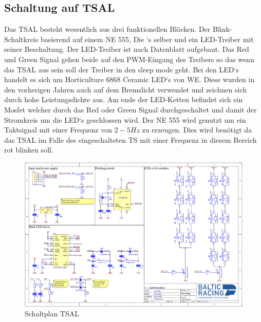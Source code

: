 \FloatBarrier
\subsection{Schaltung auf \ac{TSAL}}

Das \ac{TSAL} besteht wesentlich aus drei funktionellen Blöcken. Der Blink-Schaltkreis basierend auf einem NE 555, Die `s selber und ein \ac{LED}-Treiber mit seiner Beschaltung. Der \ac{LED}-Treiber ist nach Datenblatt aufgebaut. Das Red und Green Signal gehen beide auf den \ac{PWM}-Eingang des Treibers so das wenn das \ac{TSAL} aus sein soll der Treiber in den sleep mode geht. Bei den \ac{LED}`s handelt es sich um Horticulture 6868 Ceramic \ac{LED}`s von \ac{WE}. Diese wurden in den vorherigen Jahren auch auf dem Bremslicht verwendet und zeichnen sich durch hohe Leistungsdichte aus. Am ende der \ac{LED}-Ketten befindet sich ein Mosfet welcher durch das Red oder Green Signal durchgeschaltet und damit der Stromkreis um die \ac{LED}`s geschlossen wird. Der NE 555 wird genutzt um ein Taktsignal mit einer Frequenz von \ensuremath{2-5 Hz} zu erzeugen. Dies wird benötigt da das \ac{TSAL} im Falle des eingeschalteten \ac{TS} mit einer Frequenz in diesem Bereich rot blinken soll.

\begin{figure}
	\centering
	\includegraphics[width=0.7\linewidth]{"bilder/Tsal Schematic"}
	\caption{Schaltplan \ac{TSAL}}
	\label{fig:tsal-schematic}
\end{figure}

\FloatBarrier